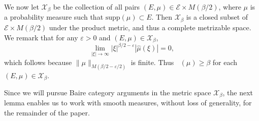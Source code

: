 \documentclass[12pt,reqno]{article}
\numberwithin{equation}{section}
\DeclareMathOperator{\fordim}{\dim_{\mathbf{F}}}
\newtheorem{theorem}{Theorem}
\numberwithin{theorem}{section}
\begin{document}
We now let $\mathcal{X}_\beta$ be the collection of all pairs $(E,\mu) \in \mathcal{E} \times M(\beta/2)$, where $\mu$ is a probability measure such that $\text{supp}(\mu) \subset E$. Then $\mathcal{X}_\beta$ is a closed subset of $\mathcal{E} \times M(\beta/2)$ under the product metric, and thus a complete metrizable space. We remark that for any $\varepsilon > 0$ and $(E,\mu) \in \mathcal{X}_\beta$,
%
\begin{equation} \label{equationGFSCSC4}
    \lim_{|\xi| \to \infty} |\xi|^{\beta/2 - \varepsilon} |\widehat{\mu}(\xi)| = 0,
\end{equation}
%
which follows because $\| \mu \|_{M(\beta/2 - \varepsilon/2)}$ is finite. Thus $\fordim(\mu) \geq \beta$ for each $(E,\mu) \in \mathcal{X}_\beta$.

\begin{comment}
\begin{theorem}
    $\mathcal{X}$ is a closed subset of $\mathcal{E} \times M(\beta)$.
\end{theorem}
\begin{proof}
    Suppose $\{ (E_k,\mu_k) \}$ is a sequence of elements of $\mathcal{X}$ converging to some tuple $(E,\mu) \in \mathcal{E} \times M(\beta)$. Fix $\varepsilon > 0$. Since $E_k \to E$ in the Hausdorff dimension, there exists $k_0$ such that for $k \geq k_0$, $E_k \subset E(\varepsilon)$. Since $\mu_k \to \mu$ weakly, this implies that $\mu$ is a probability measure, and that $\text{supp}(\mu) \subset E(\varepsilon)$. Taking $\varepsilon \to 0$ shows that $\text{supp}(\mu) \subset E$. Again for a fixed $\varepsilon > 0$, applying the triangle inequality and the reverse triangle inequality combined with \eqref{equationGFSCSC4} applied to $\mu_k$, we conclude
    \[ \lim_{|\xi| \to \infty} |\xi|^{\beta/2 - \varepsilon} |\widehat{\mu}(\xi)| = \lim_{|\xi| \to \infty} |\xi|^{\beta/2 - \varepsilon} |\widehat{\mu}(\xi) - \widehat{\mu_k}(\xi)| \leq \| \mu - \mu_k \|_{M(\beta,\varepsilon)}. \]
    Taking $k \to \infty$ shows that
    \[ \lim_{|\xi| \to \infty} |\xi|^{\beta/2 - \varepsilon} |\widehat{\mu}(\xi)| = 0, \]
    which completes the proof.
\end{proof}
\end{comment}

Since we will pursue Baire category arguments in the metric space $\mathcal{X}_\beta$, the next lemma enables us to work with smooth measures, without loss of generality, for the remainder of the paper.
\end{document}
